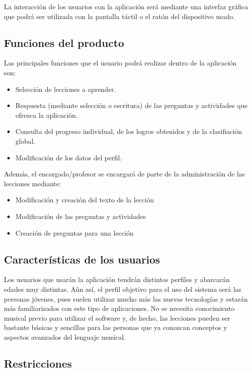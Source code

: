 La interacción de los usuarios con la aplicación será mediante una interfaz gráfica que podrá ser utilizada con la pantalla táctil o el ratón del dispositivo usado.

\subsection{Funciones del producto}
Las principales funciones que el usuario podrá realizar dentro de la aplicación son:
\begin{itemize}
\item Selección de lecciones a aprender.
\item Respuesta (mediante selección o escritura) de las preguntas y actividades que ofrezca la aplicación.
\item Consulta del progreso individual, de los logros obtenidos y de la clasifiación global.
\item Modificación de los datos del perfil.
\end {itemize}

Además, el encargado/profesor se encargará de parte de la administración de las lecciones mediante:
\begin{itemize}
    \item Modificación y creación del texto de la lección
    \item Modificación de las preguntas y actividades
    \item Creación de preguntas para una lección
\end{itemize}

\subsection{Características de los usuarios}
Los usuarios que usarán la aplicación tendrán distintos perfiles y abarcarán edades muy distintas. Aún así,
el perfil objetivo para el uso del sistema será las personas jóvenes, pues suelen utilizar mucho más las nuevas tecnologías
y estarán más familiarizados con este tipo de aplicaciones. No se necesita conocimiento musical previo para utilizar el software y,
de hecho, las lecciones pueden ser bastante básicas y sencillas para las personas que ya conozcan conceptos y aspectos avanzados del lenguaje musical.


\subsection{Restricciones}

